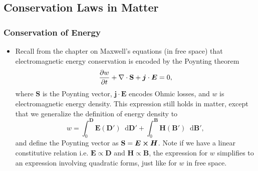 \documentclass[11pt, a4paper]{article}
\newcommand{\diff}{\mathop{}\!\mathrm{d}} %
\newcommand{\Poy}{Poynting\xspace}
\renewcommand{\vec}[1]{\bm{#1}} %
\newcommand{\E}{\vec{E}} %
\newcommand{\D}{\vec{D}}  %
\newcommand{\B}{\vec{B}} %
\renewcommand{\H}{\vec{H}}  %
\renewcommand{\S}{\mathbf{S}}  %
\renewcommand{\j}{\vec{j}}  %
\renewcommand{\div}{\nabla \cdot}
\begin{document}
\subsection{Conservation Laws in Matter}

\subsubsection{Conservation of Energy}
\begin{itemize}
    \item Recall from the chapter on Maxwell's equations (in free space) that electromagnetic energy conservation is encoded by the Poynting theorem
	\begin{equation*}
		\pdv{w}{t} + \div \S  + \j \cdot \E = 0,
	\end{equation*}
	where $ \S $ is the \Poy vector, $ \j \cdot \E $ encodes Ohmic losses, and $ w $ is electromagnetic energy density. This expression still holds in matter, except that we generalize the definition of energy density to
	\begin{equation*}
		w = \int_{0}^{\D} \E(\D') \diff \D' + \int_{0}^{\B}\H(\B')\diff \B',
	\end{equation*}
	and define the \Poy vector as $ \S = \E \cross \H $. Note if we have a linear constitutive relation i.e. $ \E \propto \D $ and $ \H \propto \B $, the expression for $ w $ simplifies to an expression involving quadratic forms, just like for $ w $ in free space.
	
\end{itemize}
\end{document}
